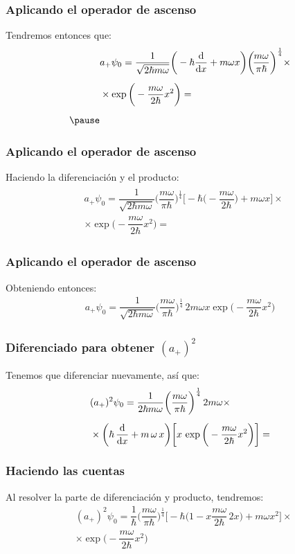 \documentclass[12pt]{beamer}
\begin{document}
\begin{frame}
\frametitle{Aplicando el operador de ascenso}
Tendremos entonces que:
\pause
\begin{eqnarray*}
\begin{aligned}
&a_{+} \psi_{0} = \dfrac{1}{\sqrt{2 \hbar m \omega}} \bigg( - \hbar \dv{x} + m \omega x \bigg) \bigg( \! \dfrac{m \omega}{\pi \hbar} \bigg)^{\frac{1}{4}} \times \\[0.5em]
&\times \exp\bigg(- \dfrac{m \omega}{2 \hbar} x^{2} \bigg) = \\[0.5em] \pause
\end{aligned}
\end{eqnarray*}
\end{frame}
\begin{frame}
\frametitle{Aplicando el operador de ascenso}
Haciendo la diferenciación y el producto:
\pause
\begin{eqnarray*}
\begin{aligned}
&a_{+} \psi_{0} = \dfrac{1}{\sqrt{2 \hbar m \omega}} \bigg( \dfrac{m \omega}{\pi \hbar} \bigg)^{\frac{1}{4}} \bigg[ - \hbar \bigg( - \dfrac{m \omega}{2 \hbar} \bigg) {+} m \omega x \bigg] \times \\[0.5em]
&\times \exp\bigg(- \dfrac{m \omega}{2 \hbar} x^{2} \bigg) = 
\end{aligned}
\end{eqnarray*}
\end{frame}
\begin{frame}
\frametitle{Aplicando el operador de ascenso}
Obteniendo entonces:
\pause
\begin{align*}
a_{+} \psi_{0} = \dfrac{1}{\sqrt{2 \hbar m \omega}} \bigg( \dfrac{m \omega}{\pi \hbar} \bigg)^{\frac{1}{4}} \, 2 m \omega x \exp\bigg(- \dfrac{m \omega}{2 \hbar} x^{2} \bigg)
\end{align*}
\end{frame}
\begin{frame}
\frametitle{Diferenciado para obtener $(a_{+})^{2}$}
Tenemos que diferenciar nuevamente, así que:
\pause
\begin{align*}
&(a_{+})^{2} \psi_{0} = \dfrac{1}{2 \hbar m \omega} \bigg( \dfrac{m \omega}{\pi \hbar} \bigg)^{\frac{1}{4}} \, 2 m \omega \times \\[0.5em]
&\times \bigg( \hbar \, \dv{x} + m \, \omega \, x \bigg) \bigg[ x \, \exp\bigg(- \dfrac{m \omega}{2 \hbar} x^{2} \bigg) \bigg] =
\end{align*}
\end{frame}
\begin{frame}
\frametitle{Haciendo las cuentas}
Al resolver la parte de diferenciación y producto, tendremos:
\pause
\begin{align*}
&(a_{+})^{2} \psi_{0} = \dfrac{1}{\hbar} \bigg( \dfrac{m \omega}{\pi \hbar} \bigg)^{\frac{1}{4}} \bigg[ - \hbar \bigg( 1 {-} x \dfrac{m \omega}{2 \hbar} \, 2 x \bigg) {+} m \omega x^{2} \bigg] \times \\[0.5em]
&\times \exp\bigg(- \dfrac{m \omega}{2 \hbar} x^{2} \bigg)
\end{align*}
\end{frame}
\end{document}
